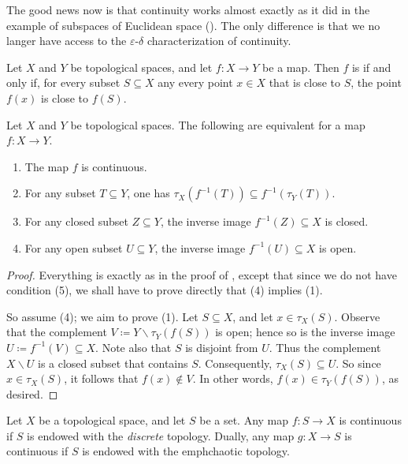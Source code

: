 
The good news now is that continuity works almost exactly as it did in the example of subspaces of Euclidean space ().
The only difference is that we no langer have access to the $\varepsilon$-$\delta$ characterization of continuity.

\begin{dfn}
	Let $X$ and $Y$ be topological spaces, and let $f \colon X \to Y $ be a map.
	Then $f$ is  if and only if, for every subset $S \subseteq X$ any every point $x\in X$ that is close to $S$, the point $f(x)$ is close to $f(S)$.
\end{dfn}

\begin{prp}
	Let $X$ and $Y$ be topological spaces.
	The following are equivalent for a map $ f \colon X \to Y $.
	\begin{enumerate}
		\item The map $ f $ is continuous.
		\item For any subset $ T \subseteq Y $, one has $\tau_X(f^{-1}(T)) \subseteq f^{-1}(\tau_Y(T))$.
		\item For any closed subset $ Z \subseteq Y $, the inverse image $ f^{-1}(Z) \subseteq X $ is closed.
		\item For any open subset $ U \subseteq Y $, the inverse image $ f^{-1}(U) \subseteq X $ is open.
	\end{enumerate}
\end{prp}

\begin{proof}
	Everything is exactly as in the proof of , except that since we do not have condition (5), we shall have to prove directly that (4) implies (1).

	So assume (4); we aim to prove (1).
	Let $S \subseteq X$, and let $x \in \tau_X(S)$.
	Observe that the complement $V \coloneq Y \smallsetminus \tau_Y(f(S))$ is open;
	hence so is the inverse image $U \coloneq f^{-1}(V) \subseteq X$.
	Note also that $S$ is disjoint from $U$.
	Thus the complement $X \smallsetminus U$ is a closed subset that contains $S$.
	Consequently, $\tau_X(S) \subseteq U$.
	So since $x \in \tau_X(S)$, it follows that $f(x) \notin V$.
	In other words, $f(x) \in \tau_Y(f(S))$, as desired.
\end{proof}

\begin{exm}
	Let $X$ be a topological space, and let $S$ be a set.
	Any map $f \colon S \to X$ is continuous if $S$ is endowed with the \emph{discrete} topology.
	Dually, any map $ g \colon X \to S $ is continuous if $S$ is endowed with the emph{chaotic} topology.
\end{exm}

